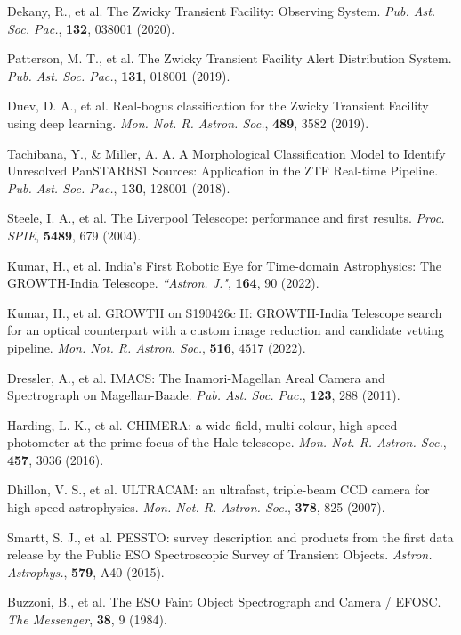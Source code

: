 \documentclass{nature_plusfigure}
\newcommand{\mn}{{Mon. Not. R. Astron. Soc.}}
\newcommand{\mnras}{\mn}
\newcommand{\aj}{{``Astron. J."}}
\newcommand{\aap}{{Astron. Astrophys.}}
\newcommand{\pasp}{{Pub. Ast. Soc. Pac.}}
\newcommand{\procspie}{Proc. SPIE}
\begin{document}
\begin{methods}
\begin{thebibliography}{10}


 Dekany, R., et al. The Zwicky Transient Facility: Observing System. \emph{\pasp}, \textbf{132}, 038001 (2020). 

 Patterson, M. T., et al. The Zwicky Transient Facility Alert Distribution System. \emph{\pasp}, \textbf{131}, 018001 (2019). 

  Duev, D. A., et al. Real-bogus classification for the Zwicky Transient Facility using deep learning. \emph{\mnras}, \textbf{489}, 3582 (2019). 

 Tachibana, Y., \& Miller, A. A. A Morphological Classification Model to Identify Unresolved PanSTARRS1 Sources: Application in the ZTF Real-time Pipeline. \emph{\pasp}, \textbf{130}, 128001 (2018). 

 Steele, I. A., et al. The Liverpool Telescope: performance and first results. \emph{\procspie}, \textbf{5489}, 679 (2004). 

 Kumar, H., et al. India's First Robotic Eye for Time-domain Astrophysics: The GROWTH-India Telescope. \emph{\aj}, \textbf{164}, 90 (2022). 

 Kumar, H., et al. GROWTH on S190426c II: GROWTH-India Telescope search for an optical counterpart with a custom image reduction and candidate vetting pipeline. \emph{\mnras}, \textbf{516}, 4517 (2022). 

 Dressler, A., et al. IMACS: The Inamori-Magellan Areal Camera and Spectrograph on Magellan-Baade. \emph{\pasp}, \textbf{123}, 288 (2011). 

 Harding, L. K., et al. CHIMERA: a wide-field, multi-colour, high-speed photometer at the prime focus of the Hale telescope. \emph{\mnras}, \textbf{457}, 3036 (2016). 

 Dhillon, V. S., et al. ULTRACAM: an ultrafast, triple-beam CCD camera for high-speed astrophysics. \emph{\mnras}, \textbf{378}, 825 (2007). 

  Smartt, S. J., et al. PESSTO: survey description and products from the first data release by the Public ESO Spectroscopic Survey of Transient Objects. \emph{\aap}, \textbf{579}, A40 (2015). 

 Buzzoni, B., et al. The ESO Faint Object Spectrograph and Camera / EFOSC. \emph{The Messenger}, \textbf{38}, 9 (1984). 


\end{thebibliography}
\end{methods}
\end{document}
